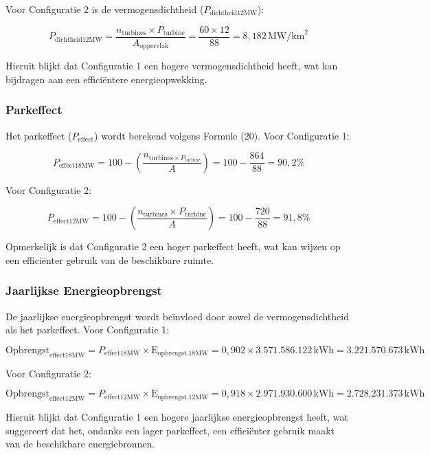 Voor Configuratie 2 is de vermogensdichtheid (\(P_{\text{dichtheid12MW}}\)):

\begin{equation} \label{eq:19}
P_{\text{dichtheid12MW}} = \frac{{n_{\text{turbines}} \times P_{\text{turbine}}}}{{A_{\text{oppervlak}}}} = \frac{{60 \times 12}}{{88}} = 8,182 \, \text{MW/km}^2
\end{equation}

Hieruit blijkt dat Configuratie 1 een hogere vermogensdichtheid heeft, wat kan bijdragen aan een efficiëntere energieopwekking.

\subsubsection{Parkeffect}

Het parkeffect (\(P_{\text{effect}}\)) wordt berekend volgens Formule (20). Voor Configuratie 1:

\begin{equation} \label{eq:20}
P_{\text{effect18MW}} = 100 - \left(\frac{{n_{\text{turbines} \times P_{\text{turbine}}}}}{{A}} \right) = 100 - \frac{{864}}{{88}} = 90,2\%
\end{equation}

Voor Configuratie 2:

\begin{equation} \label{eq:21}
P_{\text{effect12MW}} = 100 - \left(\frac{{n_{\text{turbines}} \times P_{\text{turbine}}}}{{A}} \right) = 100 - \frac{{720}}{{88}} = 91,8\%
\end{equation}

Opmerkelijk is dat Configuratie 2 een hoger parkeffect heeft, wat kan wijzen op een efficiënter gebruik van de beschikbare ruimte.

\subsubsection{Jaarlijkse Energieopbrengst}

De jaarlijkse energieopbrengst wordt beïnvloed door zowel de vermogensdichtheid als het parkeffect. Voor Configuratie 1:

\begin{equation} \label{eq:22}
\text{Opbrengst}_{\text{effect18MW}} = P_{\text{effect18MW}} \times \text{E}_{\text{opbrengst,18MW}} = 0,902 \times 3.571.586.122 \, \text{kWh} = 3.221.570.673 \, \text{kWh}
\end{equation}

Voor Configuratie 2:

\begin{equation} \label{eq:23}
\text{Opbrengst}_{\text{effect12MW}} = P_{\text{effect12MW}} \times \text{E}_{\text{opbrengst,12MW}} = 0,918 \times 2.971.930.600 \, \text{kWh} = 2.728.231.373 \, \text{kWh}
\end{equation}

Hieruit blijkt dat Configuratie 1 een hogere jaarlijkse energieopbrengst heeft, wat suggereert dat het, ondanks een lager parkeffect, een efficiënter gebruik maakt van de beschikbare energiebronnen.
